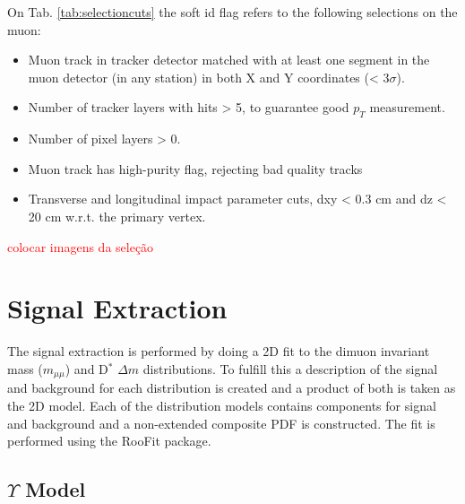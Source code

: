 On Tab. \ref{tab:selectioncuts} the soft id flag refers to the following selections on the muon: 
\begin{itemize}
  \item Muon track in tracker detector matched with at least one segment in the muon detector (in any station) in both X and Y coordinates (< 3$\sigma$).
  \item Number of tracker layers with hits > 5, to guarantee good $p_T$ measurement. 
  \item Number of pixel layers > 0.
  \item Muon track has high-purity flag, rejecting bad quality tracks
  \item Transverse and longitudinal impact parameter cuts, dxy < 0.3 cm and dz < 20 cm w.r.t. the primary vertex.
\end{itemize}

\textcolor{red}{colocar imagens da seleção}

\section{Signal Extraction}\label{sec:sig_extraction}

The signal extraction is performed by doing a 2D fit to the dimuon invariant mass ($m_{\mu\mu}$) and D$^*$ $\Delta m$ distributions. To fulfill this a description of the signal and background for each distribution is created and a product of both is taken as the 2D model. Each of the distribution models contains components for signal and background and a non-extended composite PDF is constructed. The fit is performed using the RooFit package.

\subsection{\texorpdfstring{$\Upsilon$}{Y} Model}

